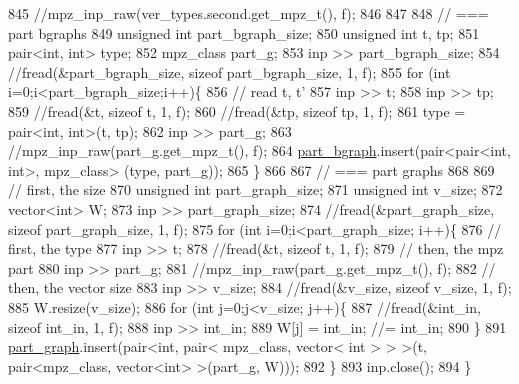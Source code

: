 \begin{DoxyCode}
845   \textcolor{comment}{//mpz\_inp\_raw(ver\_types.second.get\_mpz\_t(), f);}
846 
847 
848   \textcolor{comment}{// === part bgraphs}
849   \textcolor{keywordtype}{unsigned} \textcolor{keywordtype}{int} part\_bgraph\_size;
850   \textcolor{keywordtype}{unsigned} \textcolor{keywordtype}{int} t, tp;
851   pair<int, int> type; 
852   mpz\_class part\_g;
853   inp >> part\_bgraph\_size;
854   \textcolor{comment}{//fread(&part\_bgraph\_size, sizeof part\_bgraph\_size, 1, f);}
855   \textcolor{keywordflow}{for} (\textcolor{keywordtype}{int} i=0;i<part\_bgraph\_size;i++)\{
856     \textcolor{comment}{// read t, t'}
857     inp >> t;
858     inp >> tp;
859     \textcolor{comment}{//fread(&t, sizeof t, 1, f);}
860     \textcolor{comment}{//fread(&tp, sizeof tp, 1, f);}
861     type = pair<int, int>(t, tp);
862     inp >> part\_g;
863     \textcolor{comment}{//mpz\_inp\_raw(part\_g.get\_mpz\_t(), f);}
864     \hyperlink{classmarked__graph__compressed_a7b3267063fba30b45eb21b3ba4e07536}{part\_bgraph}.insert(pair<pair<int, int>, mpz\_class> (type, part\_g));
865   \}
866 
867   \textcolor{comment}{// === part graphs}
868 
869   \textcolor{comment}{// first, the size}
870   \textcolor{keywordtype}{unsigned} \textcolor{keywordtype}{int} part\_graph\_size;
871   \textcolor{keywordtype}{unsigned} \textcolor{keywordtype}{int} v\_size;
872   vector<int> W; 
873   inp >> part\_graph\_size;
874   \textcolor{comment}{//fread(&part\_graph\_size, sizeof part\_graph\_size, 1, f);}
875   \textcolor{keywordflow}{for} (\textcolor{keywordtype}{int} i=0;i<part\_graph\_size; i++)\{
876     \textcolor{comment}{// first, the type}
877     inp >> t; 
878     \textcolor{comment}{//fread(&t, sizeof t, 1, f);}
879     \textcolor{comment}{// then, the mpz part}
880     inp >> part\_g;
881     \textcolor{comment}{//mpz\_inp\_raw(part\_g.get\_mpz\_t(), f);}
882     \textcolor{comment}{// then, the vector size}
883     inp >> v\_size;
884     \textcolor{comment}{//fread(&v\_size, sizeof v\_size, 1, f);}
885     W.resize(v\_size);
886     \textcolor{keywordflow}{for} (\textcolor{keywordtype}{int} j=0;j<v\_size; j++)\{
887       \textcolor{comment}{//fread(&int\_in, sizeof int\_in, 1, f);}
888       inp >> int\_in;
889       W[j] = int\_in; \textcolor{comment}{//= int\_in;}
890     \}
891     \hyperlink{classmarked__graph__compressed_ae179a4737e6eab905c18a94d44ef64b7}{part\_graph}.insert(pair<\textcolor{keywordtype}{int}, pair< mpz\_class, vector< int > > >(t, pair<mpz\_class, vector<int>
       >(part\_g, W)));
892   \}
893   inp.close();
894 \}
\end{DoxyCode}
\mbox{\label{classmarked__graph__compressed_ab9cdb7fc43badd58fb5202f74ffac723}} 
